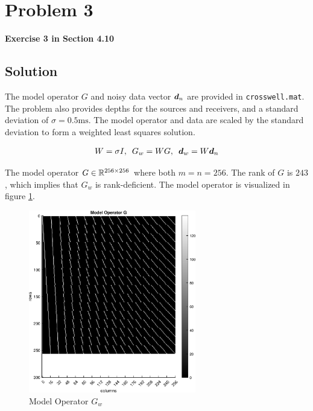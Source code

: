 
\begingroup
\allowdisplaybreaks

\newpage
\section{Problem 3}

\textbf{Exercise 3 in Section 4.10}

\subsection{Solution}

The model operator $G$ and noisy data vector $\boldsymbol{d}_n$ are provided in \verb|crosswell.mat|. The problem also provides depths for the sources and receivers, and a standard deviation of $\sigma = 0.5 \unit{\milli\second}$. The model operator and data are scaled by the standard deviation to form a weighted least squares solution. 

\begin{align*}
	W = \sigma I,\,\,\,G_w = W G,\,\,\,\boldsymbol{d}_w = W \boldsymbol{d}_n
\end{align*}

The model operator $G \in\mathbb{R}^{256 \times 256}$ where both $m = n = 256$. The rank of $G$ is $243$, which implies that $G_w$ is rank-deficient. The model operator is visualized in figure \ref{fig: prob3 model operator G_w}.

\begin{figure}[h] 
	\centering
	\includegraphics[width=0.65\textwidth]{./images/prob3_model_operator_G.eps}
	\caption{Model Operator $G_w$}
	\label{fig: prob3 model operator G_w}
\end{figure}
\FloatBarrier


